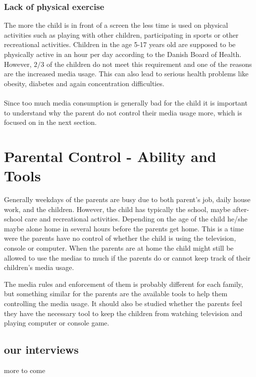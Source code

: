 \subsubsection*{Lack of physical exercise}
The more the child is in front of a screen the less time is used on physical activities such as playing with other children, participating 
in sports or other recreational activities. Children in the age 5-17 years old are supposed to be physically active in an hour per day 
according to the Danish Board of Health. However, $2/3$ of the children do not meet this requirement and one of the reasons are 
the increased media usage.
This can also lead to serious health problems like obesity, diabetes and again concentration difficulties.  \\\\


Since too much media consumption is generally bad for the child it is important to understand why the parent do not control their media usage more, 
which is focused on in the next section.


\section{Parental Control - Ability and Tools} %

Generally weekdays of the parents are busy due to both parent's job, daily house work, and the children. However, the child has typically 
the school, maybe after-school care and recreational activities. Depending on the age of the child he/she maybe alone home in several hours 
before the parents get home. This is a time were the parents have no control of whether the child is using the television, console or computer. 
When the parents are at home the child might still be allowed to use the medias to much if the parents do or cannot keep track of their children's 
media usage.

The media rules and enforcement of them is probably different for each family, but something similar for the parents are the available tools to help 
them controlling the media usage. It should also be studied whether the parents feel they have the necessary tool to keep the children from
watching television and playing computer or console game.   

 
\subsection{our interviews}

more to come
